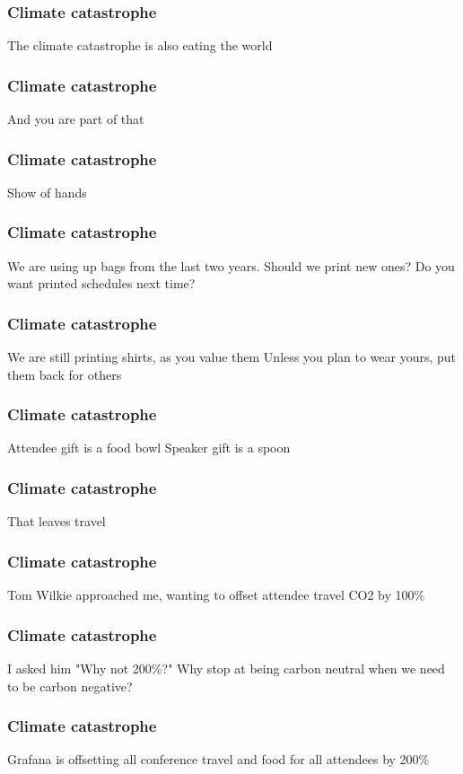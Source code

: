 \documentclass[aspectratio=169]{beamer}
\begin{document}
\begin{frame}
	\frametitle{Climate catastrophe}
	\centering
	\vfill
	The climate catastrophe is also eating the world
	\vfill
\end{frame}

\begin{frame}
	\frametitle{Climate catastrophe}
	\centering
	\vfill
	And you are part of that
	\vfill
\end{frame}

\begin{frame}
	\frametitle{Climate catastrophe}
	\centering
	\vfill
	Show of hands
	\vfill
\end{frame}

\begin{frame}
	\frametitle{Climate catastrophe}
	\centering
	\vfill
	We are using up bags from the last two years. Should we print new ones?
	\vfill
	Do you want printed schedules next time?
	\vfill
\end{frame}

\begin{frame}
	\frametitle{Climate catastrophe}
	\centering
	\vfill
	We are still printing shirts, as you value them
	\vfill
	Unless you plan to wear yours, put them back for others
	\vfill
\end{frame}

\begin{frame}
	\frametitle{Climate catastrophe}
	\centering
	\vfill
	Attendee gift is a food bowl
	\vfill
	Speaker gift is a spoon
	\vfill
\end{frame}

\begin{frame}
	\frametitle{Climate catastrophe}
	\centering
	\vfill
	That leaves travel
	\vfill
\end{frame}

\begin{frame}
	\frametitle{Climate catastrophe}
	\centering
	\vfill
	Tom Wilkie approached me, wanting to offset attendee travel CO2 by 100\%
	\vfill
\end{frame}

\begin{frame}
	\frametitle{Climate catastrophe}
	\centering
	\vfill
	I asked him "Why not 200\%?"
	\vfill
	Why stop at being carbon neutral when we need to be carbon negative?
	\vfill
\end{frame}

\begin{frame}
	\frametitle{Climate catastrophe}
	\centering
	\vfill
	Grafana is offsetting all conference travel and food for all attendees by 200\%
	\vfill
\end{frame}
\end{document}
